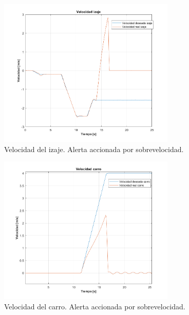 \documentclass[11pt]{article}
\begin{document}
\begin{figure}[!h]
	\centering
	\includegraphics[width=0.75\textwidth]{images/Freno_sobrevelocidad/velocidad_izaje.png}
	\caption{Velocidad del izaje. Alerta accionada por sobrevelocidad.}
	\label{fig:sobrevelocidad_velocidad_izaje}
\end{figure}

\begin{figure}[!h]
	\centering
	\includegraphics[width=0.75\textwidth]{images/Freno_sobrevelocidad/velocidad_carro.png}
	\caption{Velocidad del carro. Alerta accionada por sobrevelocidad.}
	\label{fig:sobrevelocidad_velocidad_carro}
\end{figure}
\end{document}
